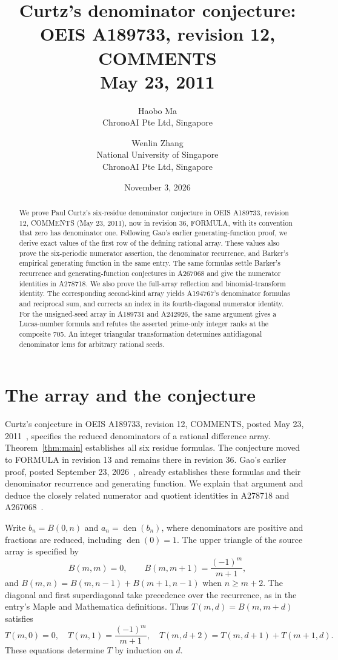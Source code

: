 \documentclass[11pt]{article}
\title{Curtz's denominator conjecture:\\OEIS A189733, revision 12, COMMENTS\\\large May 23, 2011}
\author{Haobo Ma\\\small ChronoAI Pte Ltd, Singapore
\and Wenlin Zhang\\\small National University of Singapore\\\small ChronoAI Pte Ltd, Singapore}
\date{November 3, 2026}
\begin{document}
\maketitle
\begin{abstract}
We prove Paul Curtz's six-residue denominator conjecture in OEIS A189733,
revision 12, COMMENTS (May 23, 2011), now in revision 36, FORMULA,
with its convention that zero has denominator one.
Following Gao's earlier generating-function proof, we derive exact values of
the first row of the defining rational array. These values also prove the
six-periodic numerator assertion, the denominator recurrence, and Barker's
empirical generating function in the same entry. The same formulas settle
Barker's recurrence and generating-function conjectures in A267068 and
give the numerator identities in A278718. We also prove the full-array
reflection and binomial-transform identity. The corresponding second-kind
array yields A194767's denominator formulas and reciprocal sum, and corrects
an index in its fourth-diagonal numerator identity. For the unsigned-seed
array in A189731 and A242926, the same argument gives a Lucas-number formula
and refutes the asserted prime-only integer ranks at the composite 705.
An integer triangular transformation determines antidiagonal denominator lcms
for arbitrary rational seeds.
\end{abstract}

\section{The array and the conjecture}
Curtz's conjecture in OEIS A189733, revision 12, COMMENTS, posted
May 23, 2011~\cite{curtz}, specifies the reduced denominators of a rational
difference array. Theorem~\ref{thm:main} establishes all six residue formulas.
The conjecture moved to FORMULA in revision 13 and remains there in
revision 36. Gao's earlier proof, posted September 23, 2026~\cite{gao},
already establishes these formulas and their denominator recurrence and
generating function. We explain that argument and deduce the closely related
numerator and quotient identities in A278718 and A267068~\cite{numerators,quotients}.

Write $b_n=B(0,n)$ and $a_n=\operatorname{den}(b_n)$, where denominators are
positive and fractions are reduced, including $\operatorname{den}(0)=1$.
The upper triangle of the source array is specified by
\[
 B(m,m)=0,\qquad B(m,m+1)=\frac{(-1)^m}{m+1},
\]
and $B(m,n)=B(m,n-1)+B(m+1,n-1)$ when $n\ge m+2$.
The diagonal and first superdiagonal take precedence over the recurrence,
as in the entry's Maple and Mathematica definitions.
Thus $T(m,d)=B(m,m+d)$ satisfies
\begin{equation}\label{eq:triangle}
 T(m,0)=0,\quad T(m,1)=\frac{(-1)^m}{m+1},\quad
 T(m,d+2)=T(m,d+1)+T(m+1,d).
\end{equation}
These equations determine $T$ by induction on $d$.
\end{document}
